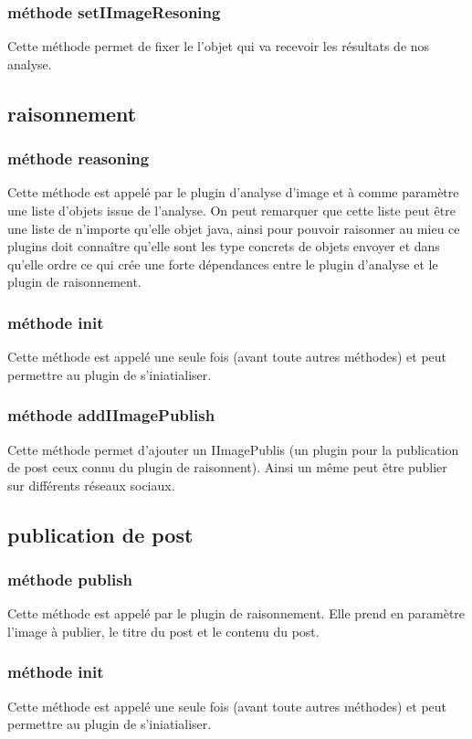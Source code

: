 \documentclass[a4paper , 12pt]{article}
\begin{document}
  \subsubsection*{méthode setIImageResoning}
  Cette méthode permet de fixer le l'objet qui va recevoir les résultats de nos analyse.

  \subsection{raisonnement}
 
  \subsubsection*{méthode reasoning}
  Cette méthode est appelé par le plugin d'analyse d'image et à comme paramètre une liste d'objets issue de l'analyse.
  On peut remarquer que cette liste peut être une liste de n'importe qu'elle objet java, ainsi pour pouvoir raisonner au mieu ce plugins doit connaître qu'elle sont les type concrets de objets envoyer et dans qu'elle ordre ce qui crée une forte dépendances entre le plugin d'analyse et le plugin de raisonnement.
  \subsubsection*{méthode init}
  Cette méthode est appelé une seule fois (avant toute autres méthodes) et peut permettre au plugin de s'iniatialiser.
  \subsubsection*{méthode addIImagePublish}
  Cette méthode permet d'ajouter un IImagePublis (un plugin pour la publication de post  ceux connu du plugin de raisonnent). Ainsi un même peut être publier sur différents réseaux sociaux.

  \subsection{publication de post}
  
  \subsubsection*{méthode publish}
  Cette méthode est appelé par le plugin de raisonnement. Elle prend en paramètre l'image à publier, le titre du post et le contenu du post.
  \subsubsection*{méthode init}
  Cette méthode est appelé une seule fois (avant toute autres méthodes) et peut permettre au plugin de s'iniatialiser.
\end{document}
